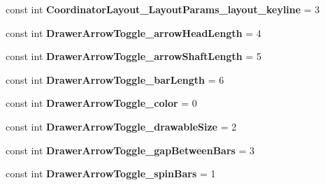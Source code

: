 \begin{DoxyCompactItemize}
\item 
\hypertarget{classClient_1_1Droid_1_1Resource_1_1Styleable_a71977b2c5004331828657ba537849f22}{}const int {\bfseries Coordinator\+Layout\+\_\+\+Layout\+Params\+\_\+layout\+\_\+keyline} = 3\label{classClient_1_1Droid_1_1Resource_1_1Styleable_a71977b2c5004331828657ba537849f22}

\item 
\hypertarget{classClient_1_1Droid_1_1Resource_1_1Styleable_a8907fdfe818646cb09f4d6bc859b3e99}{}const int {\bfseries Drawer\+Arrow\+Toggle\+\_\+arrow\+Head\+Length} = 4\label{classClient_1_1Droid_1_1Resource_1_1Styleable_a8907fdfe818646cb09f4d6bc859b3e99}

\item 
\hypertarget{classClient_1_1Droid_1_1Resource_1_1Styleable_a5c2791fe20f7be54f6e39a0ba3acfe3a}{}const int {\bfseries Drawer\+Arrow\+Toggle\+\_\+arrow\+Shaft\+Length} = 5\label{classClient_1_1Droid_1_1Resource_1_1Styleable_a5c2791fe20f7be54f6e39a0ba3acfe3a}

\item 
\hypertarget{classClient_1_1Droid_1_1Resource_1_1Styleable_aebe6d9e955e75ecf1ac55b72d9860beb}{}const int {\bfseries Drawer\+Arrow\+Toggle\+\_\+bar\+Length} = 6\label{classClient_1_1Droid_1_1Resource_1_1Styleable_aebe6d9e955e75ecf1ac55b72d9860beb}

\item 
\hypertarget{classClient_1_1Droid_1_1Resource_1_1Styleable_a56db385cb15b845f0c490e157cbea512}{}const int {\bfseries Drawer\+Arrow\+Toggle\+\_\+color} = 0\label{classClient_1_1Droid_1_1Resource_1_1Styleable_a56db385cb15b845f0c490e157cbea512}

\item 
\hypertarget{classClient_1_1Droid_1_1Resource_1_1Styleable_a5799d193fba5a9d27c1692b735f21c22}{}const int {\bfseries Drawer\+Arrow\+Toggle\+\_\+drawable\+Size} = 2\label{classClient_1_1Droid_1_1Resource_1_1Styleable_a5799d193fba5a9d27c1692b735f21c22}

\item 
\hypertarget{classClient_1_1Droid_1_1Resource_1_1Styleable_ac2a1e4751aacf388f523e742f574a57e}{}const int {\bfseries Drawer\+Arrow\+Toggle\+\_\+gap\+Between\+Bars} = 3\label{classClient_1_1Droid_1_1Resource_1_1Styleable_ac2a1e4751aacf388f523e742f574a57e}

\item 
\hypertarget{classClient_1_1Droid_1_1Resource_1_1Styleable_ab9dd646b435f2ecbffd4f979678ceb27}{}const int {\bfseries Drawer\+Arrow\+Toggle\+\_\+spin\+Bars} = 1\label{classClient_1_1Droid_1_1Resource_1_1Styleable_ab9dd646b435f2ecbffd4f979678ceb27}


\end{DoxyCompactItemize}
